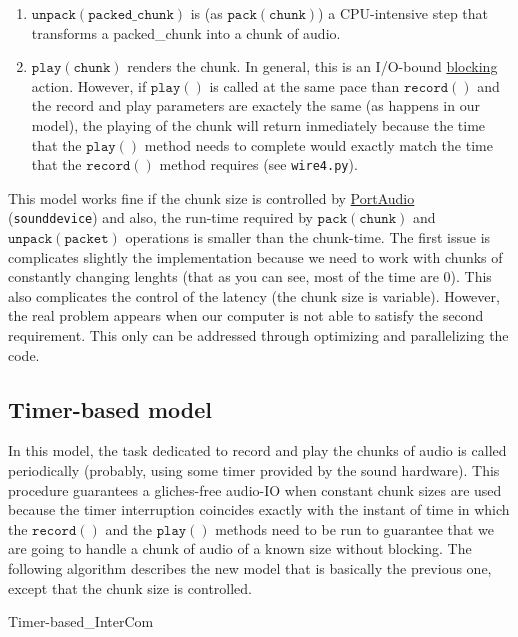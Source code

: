 \begin{enumerate}
\item $\mathtt{unpack(packed\_chunk)}$ is (as $\mathtt{pack(chunk)}$)
  a CPU-intensive step that transforms a packed\_chunk into a chunk of
  audio.

\item $\mathtt{play(chunk)}$ renders the chunk. In general, this is an
  I/O-bound
  \href{https://python-sounddevice.readthedocs.io/en/0.4.0/api/streams.html#sounddevice.Stream.write}{blocking}
  action. However, if $\mathtt{play()}$ is called at the same pace
  than $\mathtt{record()}$ and the record and play parameters are
  exactely the same (as happens in our model), the playing of the
  chunk will return inmediately because the time that the
  $\mathtt{play()}$ method needs to complete would exactly match the
  time that the $\mathtt{record()}$ method requires (see
  \texttt{wire4.py}).
\end{enumerate}

This model works fine if the chunk size is controlled by
\href{http://www.portaudio.com/}{PortAudio}~\cite{portaudio}
(\texttt{sounddevice}) and also, the run-time required by
$\mathtt{pack(chunk)}$ and $\mathtt{unpack(packet)}$ operations is
smaller than the chunk-time. The first issue is complicates slightly
the implementation because we need to work with chunks of constantly
changing lenghts (that as you can see, most of the time are 0). This
also complicates the control of the latency (the chunk size is
variable). However, the real problem appears when our computer is not
able to satisfy the second requirement. This only can be addressed
through optimizing and parallelizing the code.

\subsection{Timer-based model}

In this model, the task dedicated to record and play the chunks of
audio is called periodically (probably, using some timer provided by
the sound hardware). This procedure guarantees a gliches-free audio-IO
when constant chunk sizes are used because the timer interruption
coincides exactly with the instant of time in which the
$\mathtt{record()}$ and the $\mathtt{play()}$ methods need to be run
to guarantee that we are going to handle a chunk of audio of a known
size without blocking. The following algorithm describes the new model
that is basically the previous one, except that the chunk size is
controlled.

\begin{pseudocode}{Timer-based\_InterCom}{~}
  \BEGIN
     \GETS {}\\
     \GETS {}\\
    \\
     \GETS {}\\
     \GETS {}\\
  \END
  \ENDPROCEDURE
\end{pseudocode}

